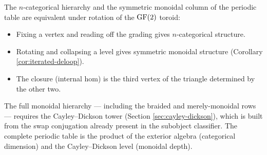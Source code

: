 \begin{remark}
The $n$-categorical hierarchy and the symmetric monoidal
column of the periodic table are equivalent under
rotation of the $\operatorname{GF}(2)$ toroid:
\begin{itemize}[nosep]
  \item Fixing a vertex and reading off the grading gives
    $n$-categorical structure.
  \item Rotating and collapsing a level gives symmetric
    monoidal structure (Corollary \ref{cor:iterated-deloop}).
  \item The closure (internal hom) is the third vertex of
    the triangle determined by the other two.
\end{itemize}
The full monoidal hierarchy --- including the braided and
merely-monoidal rows --- requires the Cayley--Dickson
tower (Section \ref{sec:cayley-dickson}), which is built
from the swap conjugation already present in the
subobject classifier. The complete periodic table is the
product of the exterior algebra (categorical dimension)
and the Cayley--Dickson level (monoidal depth).
\end{remark}


